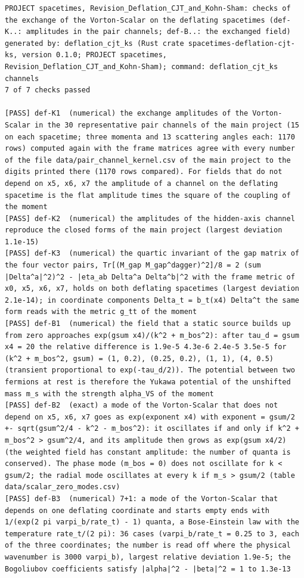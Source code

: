 \documentclass[
  10pt,
]{article}
\begin{document}
\begin{verbatim}
PROJECT spacetimes, Revision_Deflation_CJT_and_Kohn-Sham: checks of the exchange of the Vorton-Scalar on the deflating spacetimes (def-K..: amplitudes in the pair channels; def-B..: the exchanged field)
generated by: deflation_cjt_ks (Rust crate spacetimes-deflation-cjt-ks, version 0.1.0; PROJECT spacetimes, Revision_Deflation_CJT_and_Kohn-Sham); command: deflation_cjt_ks channels
7 of 7 checks passed

[PASS] def-K1  (numerical) the exchange amplitudes of the Vorton-Scalar in the 30 representative pair channels of the main project (15 on each spacetime; three momenta and 13 scattering angles each: 1170 rows) computed again with the frame matrices agree with every number of the file data/pair_channel_kernel.csv of the main project to the digits printed there (1170 rows compared). For fields that do not depend on x5, x6, x7 the amplitude of a channel on the deflating spacetime is the flat amplitude times the square of the coupling of the moment
[PASS] def-K2  (numerical) the amplitudes of the hidden-axis channel reproduce the closed forms of the main project (largest deviation 1.1e-15)
[PASS] def-K3  (numerical) the quartic invariant of the gap matrix of the four vector pairs, Tr[(M_gap M_gap^dagger)^2]/8 = 2 (sum |Delta^a|^2)^2 - |eta_ab Delta^a Delta^b|^2 with the frame metric of x0, x5, x6, x7, holds on both deflating spacetimes (largest deviation 2.1e-14); in coordinate components Delta_t = b_t(x4) Delta^t the same form reads with the metric g_tt of the moment
[PASS] def-B1  (numerical) the field that a static source builds up from zero approaches exp(gsum x4)/(k^2 + m_bos^2): after tau_d = gsum x4 = 20 the relative difference is 1.9e-5 4.3e-6 2.4e-5 3.5e-5 for (k^2 + m_bos^2, gsum) = (1, 0.2), (0.25, 0.2), (1, 1), (4, 0.5) (transient proportional to exp(-tau_d/2)). The potential between two fermions at rest is therefore the Yukawa potential of the unshifted mass m_s with the strength alpha_VS of the moment
[PASS] def-B2  (exact) a mode of the Vorton-Scalar that does not depend on x5, x6, x7 goes as exp(exponent x4) with exponent = gsum/2 +- sqrt(gsum^2/4 - k^2 - m_bos^2): it oscillates if and only if k^2 + m_bos^2 > gsum^2/4, and its amplitude then grows as exp(gsum x4/2) (the weighted field has constant amplitude: the number of quanta is conserved). The phase mode (m_bos = 0) does not oscillate for k < gsum/2; the radial mode oscillates at every k if m_s > gsum/2 (table data/scalar_zero_modes.csv)
[PASS] def-B3  (numerical) 7+1: a mode of the Vorton-Scalar that depends on one deflating coordinate and starts empty ends with 1/(exp(2 pi varpi_b/rate_t) - 1) quanta, a Bose-Einstein law with the temperature rate_t/(2 pi): 36 cases (varpi_b/rate_t = 0.25 to 3, each of the three coordinates; the number is read off where the physical wavenumber is 3000 varpi_b), largest relative deviation 1.9e-5; the Bogoliubov coefficients satisfy |alpha|^2 - |beta|^2 = 1 to 1.3e-13

\end{verbatim}
\end{document}
